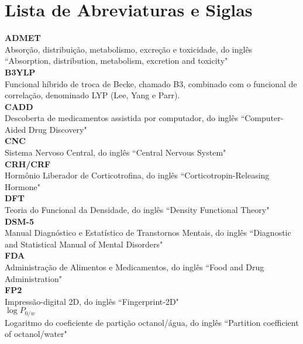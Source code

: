 \chapter*{Lista de Abreviaturas e Siglas}

\textbf{ADMET} \\  Absorção, distribuição, metabolismo, excreção e toxicidade, do inglês ``Absorption, distribution, metabolism, excretion and toxicity" \\

\textbf{B3YLP} \\ Funcional híbrido de troca de Becke, chamado B3, combinado com o funcional de correlação, denominado LYP (Lee, Yang e Parr). \\

\textbf{CADD}  \\  Descoberta de medicamentos assistida por computador, do inglês ``Computer-Aided Drug Discovery" \\

\textbf{CNC} \\  Sistema Nervoso Central, do inglês ``Central Nervous System" \\

\textbf{CRH/CRF} \\  Hormônio Liberador de Corticotrofina, do inglês ``Corticotropin-Releasing Hormone" \\

\textbf{DFT} \\    Teoria do Funcional da Densidade, do inglês ``Density Functional Theory" \\ 

\textbf{DSM-5} \\  Manual Diagnóstico e Estatístico de Transtornos Mentais, do inglês ``Diagnostic and Statistical Manual of Mental Disorders" \\

\textbf{FDA} \\   Administração de Alimentos e Medicamentos, do inglês ``Food and Drug Administration" \\

\textbf{FP2} \\   Impressão-digital 2D, do inglês ``Fingerprint-2D" \\

\textbf{$\log P_{0/w}$} \\ Logaritmo do coeficiente de partição octanol/água, do inglês ``Partition coefficient of octanol/water" \\

